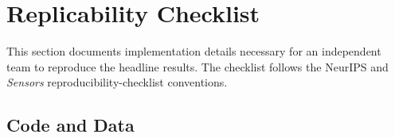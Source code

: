 
\section{Replicability Checklist}
\label{supp:app-replicability}

This section documents implementation details necessary for an independent
team to reproduce the headline results. The checklist follows the NeurIPS
and \emph{Sensors} reproducibility-checklist conventions.

\subsection{Code and Data}
\label{app:repl-code}

